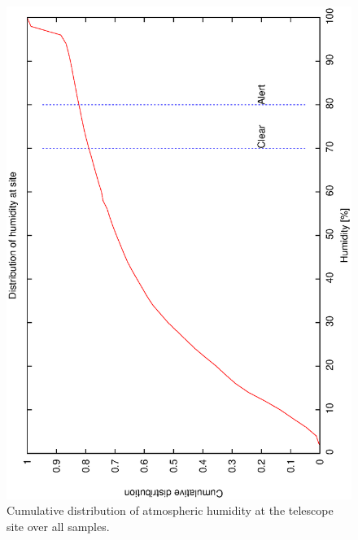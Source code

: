 \begin{figure}[htbp]
\begin{center}
    \includegraphics[scale=0.4, angle=-90]{figures/ecs/hum_cum.dat.eps}
\end{center} 
\caption[Cumulative distribution of humidity at telescope site.]
{Cumulative distribution of atmospheric humidity at the telescope site over all samples.}
\label{fig:met_humidity_cum_dist}
\end{figure}

